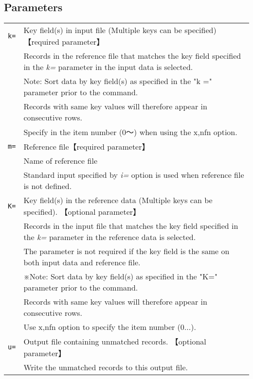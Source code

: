 \documentclass[a4paper]{jarticle}
\begin{document}
\subsection*{Parameters}
\begin{table}[htbp]
{\small
\begin{tabular}{ll}
\verb|k=|    & Key field(s) in input file  (Multiple keys can be specified)【required parameter】\\
& Records in the reference file that matches the key field specified in the \emph{k=} parameter in the input data is selected.   \\
& Note: Sort data by key field(s) as specified in the "k =" parameter prior to the command. \\
& Records with same key values will therefore appear in consecutive rows.  \\
& Specify in the item number (0〜) when using the x,nfn option. \\
\verb|m=|    & Reference file【required parameter】\\
& Name of reference file \\
& Standard input specified by \emph{i=} option is used when reference file is not defined. \\
\verb|K=|    & Key field(s) in the reference data (Multiple keys can be specified). 【optional parameter】\\
& Records in the input file that matches the key field specified in the \emph{k=} parameter in the reference data is selected.   \\
& The parameter is not required if the key field is the same on both input data and reference file. \\
&  ※Note: Sort data by key field(s) as specified in the "K=" parameter prior to the command. \\
& Records with same key values will therefore appear in consecutive rows. \\
& Use x,nfn option to specify the item number (0...). \\
\verb|u=|    & Output file containing unmatched records. 【optional parameter】\\
& Write the unmatched records to this output file. \\
\end{tabular} 
}
\end{table} 
\end{document}
